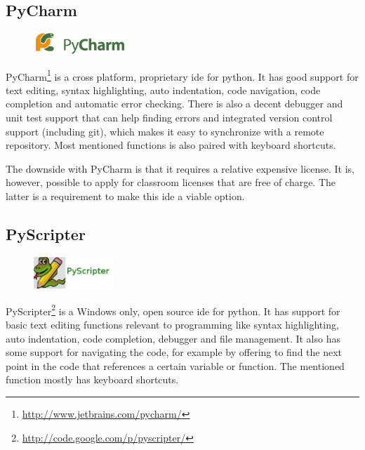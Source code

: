 \subsection{PyCharm}
\begin{figure}
	\vspace{-20pt}
	\includegraphics[width=3.5cm]{./planning/img/pycharm_logo}
	\vspace{-20pt}
\end{figure}
PyCharm\footnote{\url{http://www.jetbrains.com/pycharm/}}
is a cross platform, proprietary \Gls{ide} for \Gls{python}. It has good support
for text editing, syntax highlighting, auto indentation, code navigation, code
completion and automatic error checking. There is also a decent debugger and
unit test support that can help finding errors and integrated version control
support (including git), which makes it easy to synchronize with a remote
repository. Most mentioned functions is also paired with keyboard shortcuts.

The downside with PyCharm is that it requires a relative expensive license. It
is, however, possible to apply for classroom licenses that are free of charge.
The latter is a requirement to make this \Gls{ide} a viable option.

\subsection{PyScripter}
\begin{figure}
	\vspace{-20pt}
	\includegraphics[width=3cm]{./planning/img/pyscripter_logo}
	\vspace{-20pt}
\end{figure}
PyScripter\footnote{\url{http://code.google.com/p/pyscripter/}}
is a Windows only, open source \Gls{ide} for \Gls{python}. It has support for
basic text editing functions relevant to programming like syntax highlighting,
auto indentation, code completion, debugger and file management. It also has
some support for navigating the code, for example by offering to find the next
point in the code that references a certain variable or function. The mentioned
function mostly has keyboard shortcuts.

